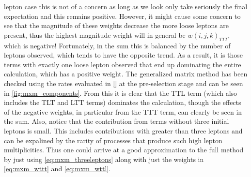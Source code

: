 lepton case this is not of a concern as long as we look only 
take seriously the final expectation and this remains positive.
However, it might cause some concern to see that 
the magnitude of these weights decrease the more loose leptons 
are present, thus the highest magnitude weight
will in general be $w(i,j,k)_{TTT}$, which is negative!
Fortunately, in the sum this is balanced by the number of 
leptons observed, which tends to have the opposite trend.
As a result, it is those terms with exactly one loose lepton
observed that end up dominating the entire calculation, which
has a positive weight. The generalized matrix method has been 
checked using the rates evaluated in \sec\ref{} at the pre-selection stage
and can be seen in \fig\ref{fig:mxm_components}.
From this it is clear that the TTL 
term (which also includes the TLT and LTT terms) 
dominates the calculation,
though the effects of the negative weights, in particular from the TTT
term, can clearly be seen in the sum. Also, notice that the contribution
from terms without three initial leptons is small. This includes contributions
with greater than three leptons and can be expalined by the rarity of
processes that produce such high lepton multiplicities.
Thus one could arrive at a good approximation to the full method
by just using \eqn\eqref{eq:mxm_threeleptons} along with just the
weights in \eqn\eqref{eq:mxm_wttt} and \eqref{eq:mxm_wttl}.
